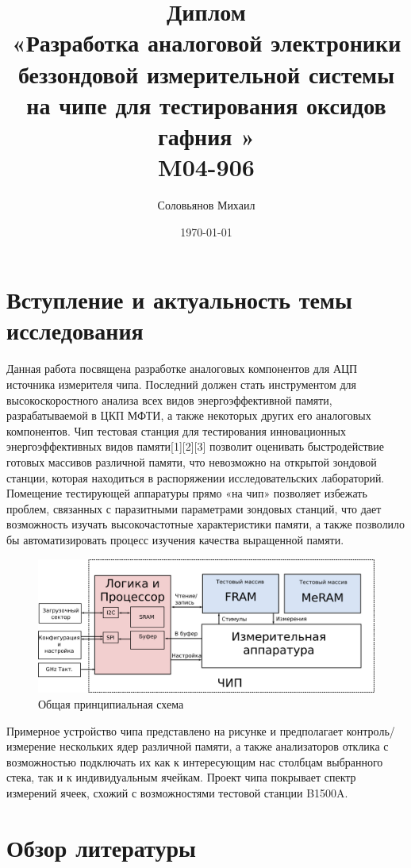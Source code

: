 \documentclass[a4paper,12pt]{article} %
\author{Соловьянов Михаил}
\title{Диплом \\ \LARGE{«Разработка аналоговой электроники беззондовой измерительной системы на чипе для тестирования оксидов гафния
»\\ M04-906}}
\date{\today}
\begin{document}

\tableofcontents
{}
\newpage



\section{Вступление и актуальность темы исследования}


Данная работа посвящена разработке аналоговых компонентов для АЦП источника измерителя чипа. Последний должен  стать инструментом для высокоскоростного  анализа всех видов энергоэффективной памяти, разрабатываемой в ЦКП МФТИ, а также некоторых других его аналоговых компонентов. Чип тестовая станция для тестирования инновационных энергоэффективных видов памяти[1][2][3] позволит оценивать быстродействие готовых массивов различной памяти, что невозможно на открытой зондовой станции, которая находиться в распоряжении исследовательских лабораторий. Помещение тестирующей аппаратуры прямо «на чип» позволяет избежать проблем, связанных с паразитными параметрами зондовых станций, что дает возможность изучать высокочастотные характеристики памяти, а также позволило бы автоматизировать процесс изучения качества выращенной памяти.



\begin{figure}[H]
    \includegraphics[width=\textwidth]{top_ru.png}
    \caption{Общая принципиальная схема}
    \label{pic:top_ru}
\end{figure}

Примерное устройство чипа представлено на рисунке и предполагает контроль/измерение нескольких ядер различной памяти, а также анализаторов отклика с возможностью подключать их как к интересующим нас столбцам выбранного стека, так и к индивидуальным ячейкам. Проект чипа покрывает спектр измерений ячеек, схожий с возможностями тестовой станции B1500A.

\section{Обзор литературы}
\end{document}
